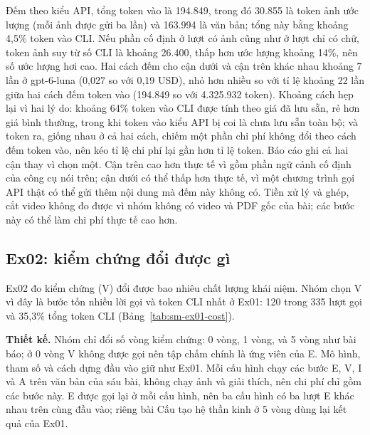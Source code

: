 Đếm theo kiểu API, tổng token vào là 194.849, trong đó 30.855 là token ảnh ước lượng (mỗi ảnh được gửi ba lần) và 163.994 là văn bản; tổng này bằng khoảng 4,5\% token vào CLI.
Nếu phần cố định ở lượt có ảnh cũng như ở lượt chỉ có chữ, token ảnh suy từ số CLI là khoảng 26.400, thấp hơn ước lượng khoảng 14\%, nên số ước lượng hơi cao.
Hai cách đếm cho cận dưới và cận trên khác nhau khoảng 7 lần ở gpt-6-luna (0,027 so với 0,19 USD), nhỏ hơn nhiều so với tỉ lệ khoảng 22 lần giữa hai cách đếm token vào (194.849 so với 4.325.932 token).
Khoảng cách hẹp lại vì hai lý do: khoảng 64\% token vào CLI được tính theo giá đã lưu sẵn, rẻ hơn giá bình thường, trong khi token vào kiểu API bị coi là chưa lưu sẵn toàn bộ; và token ra, giống nhau ở cả hai cách, chiếm một phần chi phí không đổi theo cách đếm token vào, nên kéo tỉ lệ chi phí lại gần hơn tỉ lệ token.
Báo cáo ghi cả hai cận thay vì chọn một.
Cận trên cao hơn thực tế vì gồm phần ngữ cảnh cố định của công cụ nói trên; cận dưới có thể thấp hơn thực tế, vì một chương trình gọi API thật có thể gửi thêm nội dung mà đếm này không có.
Tiền xử lý và ghép, cắt video không đo được vì nhóm không có video và PDF gốc của bài; các bước này có thể làm chi phí thực tế cao hơn.

\subsection{Ex02: kiểm chứng đổi được gì}\label{sec:sm-ex02}
Ex02 đo kiểm chứng (V) đổi được bao nhiêu chất lượng khái niệm.
Nhóm chọn V vì đây là bước tốn nhiều lời gọi và token CLI nhất ở Ex01: 120 trong 335 lượt gọi và 35,3\% tổng token CLI (Bảng~\ref{tab:sm-ex01-cost}).

\textbf{Thiết kế.}
Nhóm chỉ đổi số vòng kiểm chứng: 0 vòng, 1 vòng, và 5 vòng như bài báo; ở 0 vòng V không được gọi nên tập chấm chính là ứng viên của E.
Mô hình, tham số và cách dựng đầu vào giữ như Ex01.
Mỗi cấu hình chạy các bước E, V, I và A trên văn bản của sáu bài, không chạy ảnh và giải thích, nên chi phí chỉ gồm các bước này.
E được gọi lại ở mỗi cấu hình, nên ba cấu hình có ba lượt E khác nhau trên cùng đầu vào; riêng bài Cấu tạo hệ thần kinh ở 5 vòng dùng lại kết quả của Ex01.


